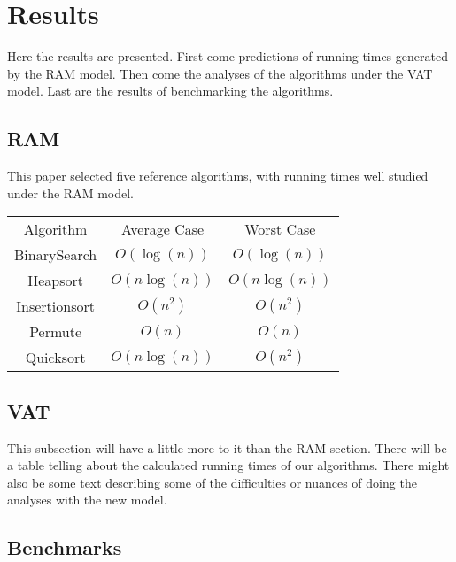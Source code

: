 \section{Results}

  Here the results are presented. First come predictions of running times
  generated by the RAM model. Then come the analyses of the algorithms under
  the VAT model. Last are the results of benchmarking the algorithms.

  \subsection{RAM}
    This paper selected five reference algorithms, with running times well 
    studied under the RAM model.
    
    \begin{tabular}{ccc}
      Algorithm     & Average Case  & Worst Case   \\
      BinarySearch  & $O(\log(n))$  & $O(\log(n))$ \\
      Heapsort      & $O(n\log(n))$ & $O(n\log(n))$\\
      Insertionsort & $O(n^2)$      & $O(n^2)$     \\
      Permute       & $O(n)$        & $O(n)$       \\
      Quicksort     & $O(n\log(n))$ & $O(n^2)$     \\
    \end{tabular}

  \subsection{VAT}
     This subsection will have a little more to it than the RAM section. There
     will be a table telling about the calculated running times of our 
     algorithms. There might also be some text describing some of the 
     difficulties or nuances of doing the analyses with the new model.

  \subsection{Benchmarks}
     
